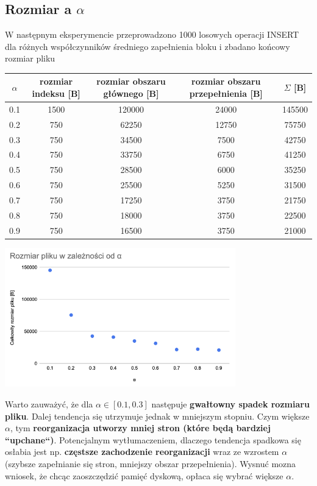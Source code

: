 \documentclass{article}
\begin{document}
\subsection{Rozmiar a $\alpha$}
W następnym eksperymencie przeprowadzono 1000 losowych operacji INSERT dla różnych współczynników średniego zapełnienia bloku i zbadano końcowy rozmiar pliku
\begin{center}
\begin{tabular}{ c | c c c | c}
 $\alpha$ & rozmiar indeksu [B] & rozmiar obszaru głównego [B] & rozmiar obszaru przepełnienia [B]  & $\Sigma$ [B] \\ 
\hline
  0.1 & 1500 & 120000 & 24000 & 145500 \\
   0.2 & 750 & 62250 & 12750 & 75750 \\
  0.3 & 750 & 34500 & 7500 & 42750 \\
  0.4 & 750 & 33750 & 6750 & 41250 \\
  0.5 & 750 & 28500 & 6000 & 35250 \\
  0.6 & 750 & 25500 & 5250 & 31500 \\
  0.7 & 750 & 17250 & 3750 & 21750 \\
  0.8 & 750 & 18000 & 3750 & 22500 \\
  0.9 & 750 & 16500 & 3750 & 21000 \\
\end{tabular}
\includegraphics[width=10cm]{rozmiar_alfa}
\end{center}
Warto zauważyć, że dla $\alpha \in [0.1,0.3]$ następuje \textbf{gwałtowny spadek rozmiaru pliku}. Dalej tendencja się utrzymuje jednak w mniejszym stopniu. Czym większe $\alpha$, tym \textbf{reorganizacja utworzy mniej stron (które będą bardziej ``upchane``)}. Potencjalnym wytłumaczeniem, dlaczego tendencja spadkowa się osłabia jest np. \textbf{częstsze zachodzenie
reorganizacji} wraz ze wzrostem $\alpha$ (szybsze zapełnianie się stron, mniejszy obszar przepełnienia). Wysnuć mozna wniosek, że chcąc zaoszczędzić pamięć dyskową, opłaca się wybrać większe $\alpha$. 
\end{document}
